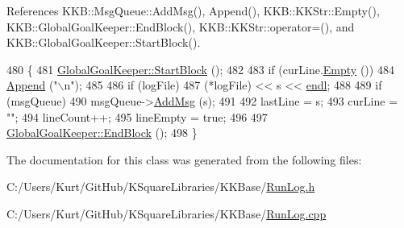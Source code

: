 References K\+K\+B\+::\+Msg\+Queue\+::\+Add\+Msg(), Append(), K\+K\+B\+::\+K\+K\+Str\+::\+Empty(), K\+K\+B\+::\+Global\+Goal\+Keeper\+::\+End\+Block(), K\+K\+B\+::\+K\+K\+Str\+::operator=(), and K\+K\+B\+::\+Global\+Goal\+Keeper\+::\+Start\+Block().


\begin{DoxyCode}
480 \{
481   \hyperlink{class_k_k_b_1_1_global_goal_keeper_a05d7aab73a0cc12c01f4dd6e8d3da839}{GlobalGoalKeeper::StartBlock} ();
482 
483   \textcolor{keywordflow}{if}  (curLine.\hyperlink{class_k_k_b_1_1_k_k_str_ac69942f73fffd672ec2a6e1c410afdb6}{Empty} ())
484     \hyperlink{class_k_k_b_1_1_run_log_a362483b3d26c2c6274bdeba514aa2cfd}{Append} (\textcolor{stringliteral}{"\(\backslash\)n"});
485 
486   \textcolor{keywordflow}{if}  (logFile)
487     (*logFile) << s << \hyperlink{namespace_k_k_b_ad1f50f65af6adc8fa9e6f62d007818a8}{endl};
488 
489   \textcolor{keywordflow}{if}  (msgQueue)
490     msgQueue->\hyperlink{class_k_k_b_1_1_msg_queue_a4d7d0adcf4f06a7afc6c8187a20bf95c}{AddMsg} (s);
491 
492   lastLine = s;
493   curLine = \textcolor{stringliteral}{""};
494   lineCount++;
495   lineEmpty = \textcolor{keyword}{true};
496 
497   \hyperlink{class_k_k_b_1_1_global_goal_keeper_a4e03a2807ca2f00c359da8625afb4cc5}{GlobalGoalKeeper::EndBlock} ();
498 \}
\end{DoxyCode}


The documentation for this class was generated from the following files\+:\begin{DoxyCompactItemize}
\item 
C\+:/\+Users/\+Kurt/\+Git\+Hub/\+K\+Square\+Libraries/\+K\+K\+Base/\hyperlink{_run_log_8h}{Run\+Log.\+h}\item 
C\+:/\+Users/\+Kurt/\+Git\+Hub/\+K\+Square\+Libraries/\+K\+K\+Base/\hyperlink{_run_log_8cpp}{Run\+Log.\+cpp}\end{DoxyCompactItemize}
